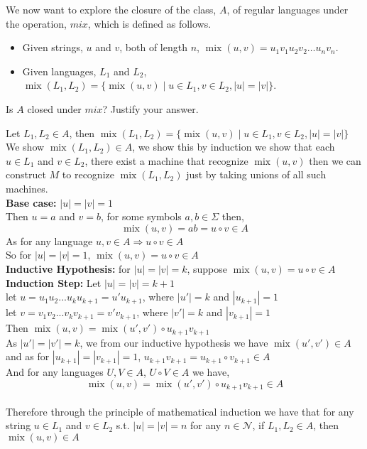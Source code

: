 \documentclass[addpoints]{exam}
\begin{document}
\begin{questions}
	\question[5] We now want to explore the closure of the class, $A$, of regular languages under the operation, $mix$, which is defined as follows.
	\begin{itemize}
		\item Given strings, $u$ and $v$, both of length $n$, $\operatorname{mix}(u,v) = u_1v_1u_2v_2\ldots u_nv_n$.
		\item Given languages, $L_1$ and $L_2$, $\operatorname{mix}(L_1,L_2) = \{\operatorname{mix}(u,v) \mid u\in L_1, v\in L_2, |u| = |v|\}$.
	\end{itemize}
	Is $A$ closed under $mix$? Justify your answer.
	\begin{solution}
		Let $L_1, L_2 \in A$, then $\operatorname{mix}(L_1,L_2) = \{\operatorname{mix}(u,v) \mid u\in L_1, v\in L_2, |u| = |v|\}$
		\\We show $\operatorname{mix}(L_1,L_2) \in A$, we show this by induction we show that each $u \in L_1$ and $v \in L_2$, there exist a machine that recognize $\operatorname{mix}(u,v)$ then we can construct $M$ to recognize $\operatorname{mix}(L_1,L_2)$ just by taking unions of all such machines.
		\\\textbf{Base case:} $|u| = |v| = 1$
		\\Then $u = a$ and $v = b$, for some symbols $a,b \in \Sigma$ then,
		$$\operatorname{mix}(u,v) = ab = u\circ v \in A$$
		As for any language $u,v\in A \Rightarrow u\circ v \in A$
		\\So for  $|u| = |v| = 1$, $\operatorname{mix}(u,v) = u\circ v \in A$
		\\\textbf{Inductive Hypothesis:} for $|u| = |v| = k$, suppose $\operatorname{mix}(u,v) = u\circ v \in A$
		\\\textbf{Induction Step:} Let $|u| = |v| = k+1$
		\\let $u = u_1u_2...u_ku_{k+1} = u'u_{k+1}$, where $|u'| = k$ and $|u_{k+1}| = 1$
		\\let $v = v_1v_2...v_kv_{k+1} = v'v_{k+1}$, where $|v'| = k$ and $|v_{k+1}| = 1$
		\\Then $\operatorname{mix}(u,v) = \operatorname{mix}(u',v')\circ u_{k+1}v_{k+1}$
		\\As $|u'| = |v'| = k$, we from our inductive hypothesis we have $ \operatorname{mix}(u',v') \in A$ and as for $|u_{k+1}| = |v_{k+1}| = 1$, $u_{k+1}v_{k+1} =u_{k+1}\circ v_{k+1} \in A$
		\\And for any languages $U,V \in A$, $U \circ V \in A$ we have,
		$$\operatorname{mix}(u,v) = \operatorname{mix}(u',v')\circ u_{k+1}v_{k+1} \in A$$
		\\Therefore through the principle of mathematical induction we have that for any string $u \in L_1$ and $v\in L_2$ s.t. $|u| = |v| = n$ for any $n \in \mathcal{N}$, if $L_1, L_2 \in A$, then $\operatorname{mix}(u,v) \in A$

\end{solution}
\end{questions}
\end{document}
